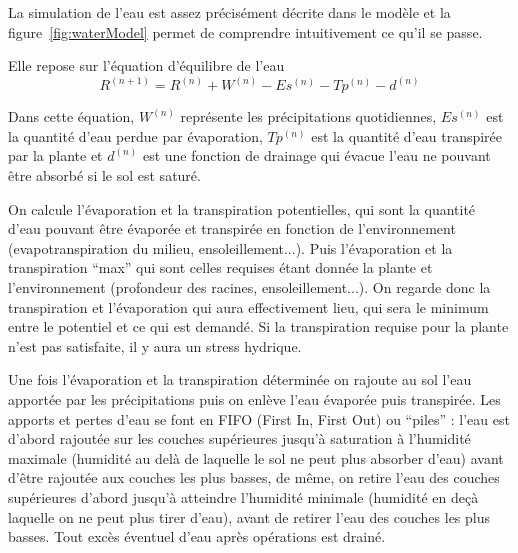 La simulation de l'eau est assez précisément décrite dans le modèle
et la figure~\ref{fig:waterModel} permet de comprendre intuitivement ce qu'il se passe. 

Elle repose sur l'équation d'équilibre de l'eau
\[ R^{(n+1)} = R^{(n)} + W^{(n)} - Es^{(n)} - Tp^{(n)} - d^{(n)}\]

Dans cette équation, $W^{(n)}$ représente les précipitations quotidiennes,
$Es^{(n)}$ est la quantité d'eau perdue par évaporation,
$Tp^{(n)}$ est la quantité d'eau transpirée par la plante 
et $d^{(n)}$ est une fonction de drainage qui évacue l'eau ne pouvant être absorbé si le sol est saturé. 

On calcule l'évaporation et la transpiration potentielles, qui sont la quantité d'eau pouvant être évaporée et transpirée en fonction de l'environnement (evapotranspiration du milieu, ensoleillement...). 
Puis l'évaporation et la transpiration ``max'' qui sont celles requises étant donnée la plante et l'environnement (profondeur des racines, ensoleillement...). 
On regarde donc la transpiration et l'évaporation qui aura effectivement lieu, qui sera le minimum entre le potentiel et ce qui est demandé.
Si la transpiration requise pour la plante n'est pas satisfaite, il y aura un stress hydrique. 

Une fois l'évaporation et la transpiration déterminée on rajoute au sol l'eau apportée par les précipitations puis on enlève l'eau évaporée puis transpirée. Les apports et pertes d'eau se font en FIFO (First In, First Out) ou ``piles'' : l'eau est d'abord rajoutée sur les couches supérieures jusqu'à saturation à l'humidité maximale (humidité au delà de laquelle le sol ne peut plus absorber d'eau) avant d'être rajoutée aux couches les plus basses, de même, on retire l'eau des couches supérieures d'abord jusqu'à atteindre l'humidité minimale (humidité en deçà laquelle on ne peut plus tirer d'eau), avant de retirer l'eau des couches les plus basses.
Tout excès éventuel d'eau après opérations est drainé.